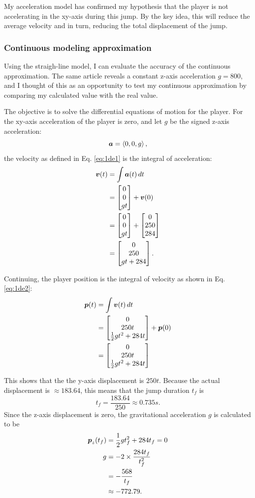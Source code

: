 My acceleration model has confirmed my hypothesis that the player is not accelerating in the xy-axis during this jump. By the key idea, this will reduce the average velocity and in turn, reducing the total displacement of the jump.

\subsubsection{Continuous modeling approximation}
Using the straigh-line model, I can evaluate the accuracy of the continuous approximation. The same article reveals a constant z-axis acceleration $g=800$, and I thought of this as an opportunity to test my continuous approximation by comparing my calculated value with the real value.

The objective is to solve the differential equations of motion for the player. For the xy-axis acceleration of the player is zero, and let $g$ be the signed z-axis acceleration:
\[
    \boldsymbol{a} = \left\langle 0, 0, g \right\rangle,
\]
the velocity as defined in Eq. \ref{eq:1de1} is the integral of acceleration:
\begin{align*}
    \boldsymbol{v}(t) &= \int \boldsymbol{a}(t) \, dt\\
    &= \begin{bmatrix}0\\0\\gt\end{bmatrix} + \boldsymbol{v}(0)\\
    &= \begin{bmatrix}0\\0\\gt\end{bmatrix} + \begin{bmatrix}0\\250\\284\end{bmatrix}\\
    &= \begin{bmatrix}0\\250\\gt + 284\end{bmatrix}.
\end{align*}

Continuing, the player position is the integral of velocity as shown in Eq. \ref{eq:1de2}:
\begin{align*}
    \boldsymbol{p}(t) &= \int \boldsymbol{v}(t) \, dt\\
    &= \begin{bmatrix}0\\250t\\\frac{1}{2}gt^2 + 284t\end{bmatrix} + \boldsymbol{p}(0)\\
    &= \begin{bmatrix}0\\250t\\\frac{1}{2}gt^2 + 284t\end{bmatrix}
\end{align*}

This shows that the the y-axis displacement is $250t$. Because the actual displacement is $\approx 183.64$, this means that the jump duration $t_f$ is
\[
    t_f = \frac{183.64}{250} \approx 0.735 \si{s}.
\]
Since the z-axis displacement is zero, the gravitational acceleration $g$ is calculated to be
\begin{align*}
    \boldsymbol{p}_{z}(t_f) &= \frac{1}{2}gt_f^2 + 284t_f = 0\\
    g &= - 2 \times \frac{284t_f}{t_f^2}\\
    &= -\frac{568}{t_f}\\
    &\approx -772.79.
\end{align*}


